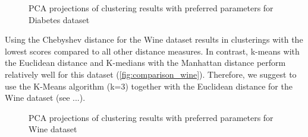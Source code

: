 \begin{figure}[H]
	\caption{PCA projections of clustering results with preferred parameters for Diabetes dataset}
	\label{fig:iris_bestparams}
\end{figure}

Using the Chebyshev distance for the Wine dataset results in clusterings with the lowest scores compared to all other distance measures. In contrast, k-means with the Euclidean distance and K-medians with the Manhattan distance perform relatively well for this dataset (\autoref{fig:comparison_wine}). Therefore, we suggest to use the K-Means algorithm (k=3) together with the Euclidean distance for the Wine dataset (see ...). 

\begin{figure}[H]
	\caption{PCA projections of clustering results with preferred parameters for Wine dataset}
	\label{fig:wine_bestparams}
\end{figure}

